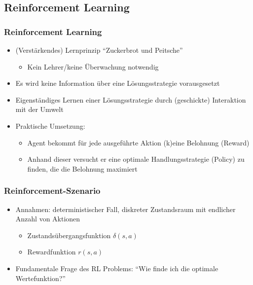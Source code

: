 \subsection{Reinforcement Learning}
\begin{frame}
  \frametitle{Reinforcement Learning}
    \begin{itemize}
      \item (Verstärkendes) Lernprinzip "`Zuckerbrot und Peitsche"'
    	\begin{itemize}
          \item Kein Lehrer/keine Überwachung notwendig
        \end{itemize}
       \item Es wird keine Information über eine Lösungsstrategie vorausgesetzt
      \item Eigenständiges Lernen einer Lösungsstrategie durch (geschickte)
      Interaktion mit der Umwelt
      \item Praktische Umsetzung:
   		\begin{itemize}
          \item Agent bekommt für jede ausgeführte Aktion (k)eine Belohnung (Reward)
          \item Anhand dieser versucht er eine optimale Handlungsstrategie
          (Policy) zu finden, die die Belohnung maximiert
     	\end{itemize}
  \end{itemize}
\end{frame}

\begin{frame}
  \frametitle{Reinforcement-Szenario}
    \begin{center}
    \end{center}

    \begin{itemize}
      \item Annahmen: deterministischer Fall, diskreter Zustandsraum mit
      endlicher Anzahl von Aktionen
      	\begin{itemize}
           \item Zustandsübergangsfunktion $\delta(s,a)$
           \item Rewardfunktion $r(s,a)$
         \end{itemize}
      \item Fundamentale Frage des RL Problems: "`Wie finde ich die optimale Wertefunktion?"'
    \end{itemize}
\end{frame}
